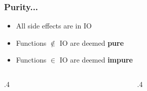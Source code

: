 \documentclass[17pt]{beamer}
\renewcommand{\(}[1]{\begin{columns}[#1]}
\renewcommand{\)}{\end{columns}}
\newcommand{\<}[1]{\begin{column}{#1}}
\renewcommand{\>}{\end{column}}
\begin{document}
\begin{frame}[fragile]
  \frametitle{Purity...}
  \begin{itemize}
  \item All side effects are in IO
  \item<2-> Functions $\not\in$ IO are deemed \textbf{pure}
  \item<3-> Functions $\in$ IO are deemed \textbf{impure}
  \end{itemize}

  \({c}
  \<{.4\textwidth}
  \begin{center}
  \end{center}
  \>
  \<{.4\textwidth}
  \begin{center}
  \end{center}
  \>
  \)
\end{frame}
\end{document}
